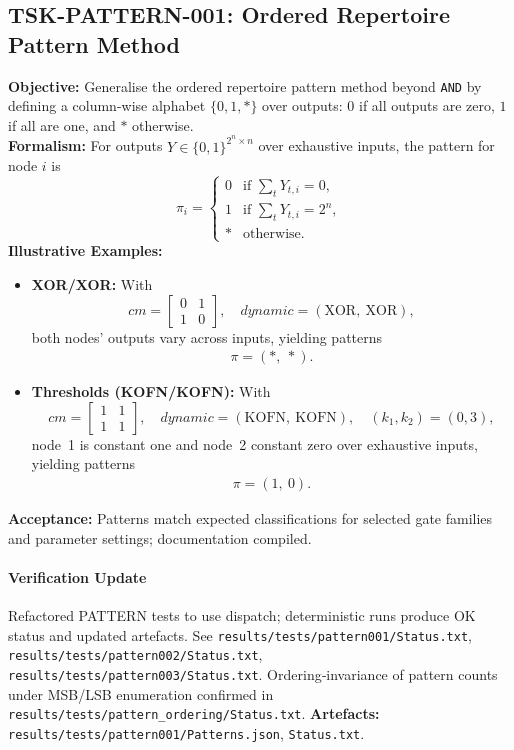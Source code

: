 \documentclass{article}
\begin{document}
\subsection{TSK-PATTERN-001: Ordered Repertoire Pattern Method}
\textbf{Objective:} Generalise the ordered repertoire pattern method beyond \texttt{AND} by defining a column-wise alphabet \(\{0,1,*\}\) over outputs: \(0\) if all outputs are zero, \(1\) if all are one, and \(*\) otherwise.\\
\textbf{Formalism:} For outputs \(Y \in \{0,1\}^{2^n \times n}\) over exhaustive inputs, the pattern for node \(i\) is
\[
\pi_i = \begin{cases}
0 & \text{if } \sum_{t} Y_{t,i} = 0,\\
1 & \text{if } \sum_{t} Y_{t,i} = 2^n,\\
* & \text{otherwise.}
\end{cases}
\]
\textbf{Illustrative Examples:}
\begin{itemize}
\item \textbf{XOR/XOR:} With
\[
cm = \begin{bmatrix}0 & 1\\ 1 & 0\end{bmatrix},\quad dynamic=(\text{XOR},\ \text{XOR}),
\]
both nodes’ outputs vary across inputs, yielding patterns
\[
\begin{array}{c}
\pi = (*,\ *).
\end{array}
\]
\item \textbf{Thresholds (KOFN/KOFN):} With
\[
cm = \begin{bmatrix}1 & 1\\ 1 & 1\end{bmatrix},\quad dynamic=(\text{KOFN},\ \text{KOFN}),\quad (k_1, k_2)=(0,3),
\]
node~1 is constant one and node~2 constant zero over exhaustive inputs, yielding patterns
\[
\begin{array}{c}
\pi = (1,\ 0).
\end{array}
\]
\end{itemize}
\textbf{Acceptance:} Patterns match expected classifications for selected gate families and parameter settings; documentation compiled.\\
\paragraph{Verification Update} Refactored PATTERN tests to use dispatch; deterministic runs produce OK status and updated artefacts. See \texttt{results/tests/pattern001/Status.txt}, \texttt{results/tests/pattern002/Status.txt}, \texttt{results/tests/pattern003/Status.txt}. Ordering‑invariance of pattern counts under MSB/LSB enumeration confirmed in \texttt{results/tests/pattern\_ordering/Status.txt}.
\textbf{Artefacts:} \texttt{results/tests/pattern001/Patterns.json}, \texttt{Status.txt}.\
\end{document}
